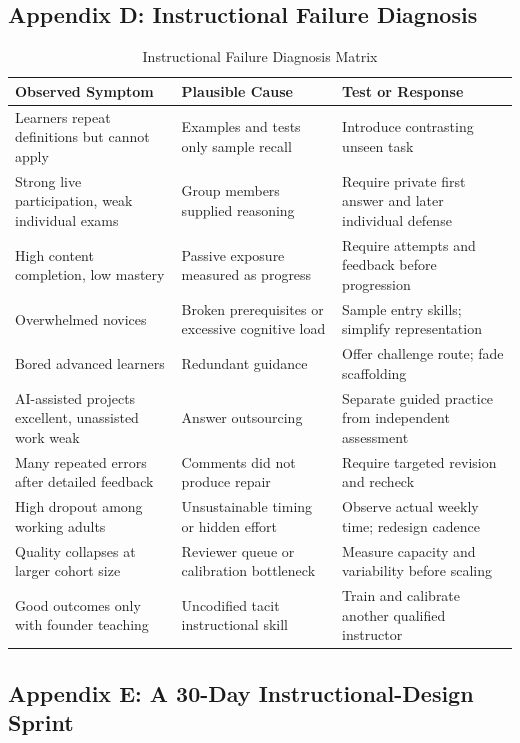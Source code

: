\subsection*{Appendix D: Instructional Failure Diagnosis}

\begin{table}[t]
\centering
\small
\caption{Instructional Failure Diagnosis Matrix}
\begin{tabularx}{\textwidth}{p{}p{}X}
\toprule
\textbf{Observed Symptom} & \textbf{Plausible Cause} & \textbf{Test or Response} \\
\midrule
Learners repeat definitions but cannot apply & Examples and tests only sample recall & Introduce contrasting unseen task \\
Strong live participation, weak individual exams & Group members supplied reasoning & Require private first answer and later individual defense \\
High content completion, low mastery & Passive exposure measured as progress & Require attempts and feedback before progression \\
Overwhelmed novices & Broken prerequisites or excessive cognitive load & Sample entry skills; simplify representation \\
Bored advanced learners & Redundant guidance & Offer challenge route; fade scaffolding \\
AI-assisted projects excellent, unassisted work weak & Answer outsourcing & Separate guided practice from independent assessment \\
Many repeated errors after detailed feedback & Comments did not produce repair & Require targeted revision and recheck \\
High dropout among working adults & Unsustainable timing or hidden effort & Observe actual weekly time; redesign cadence \\
Quality collapses at larger cohort size & Reviewer queue or calibration bottleneck & Measure capacity and variability before scaling \\
Good outcomes only with founder teaching & Uncodified tacit instructional skill & Train and calibrate another qualified instructor \\
\bottomrule
\end{tabularx}
\end{table}

\subsection*{Appendix E: A 30-Day Instructional-Design Sprint}

